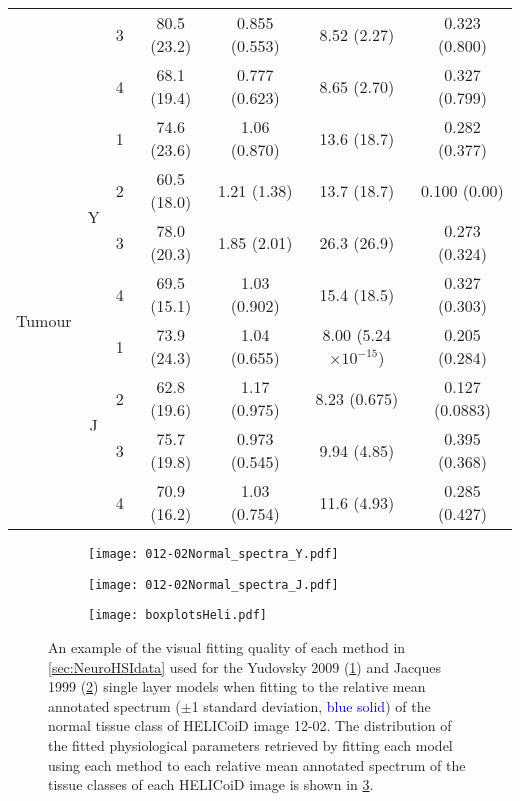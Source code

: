 \begin{table}[h!]
\begin{tabular}{|ccc|cccc|}
        & & 3 & 80.5 (23.2) & 0.855 (0.553) & 8.52 (2.27) & 0.323 (0.800) \\
        & & 4 & 68.1 (19.4) & 0.777 (0.623) & 8.65 (2.70) & 0.327 (0.799) \\
        \hline
        \multirow{8}{*}{Tumour} & \multirow{4}{*}{Y} & 1 & 74.6 (23.6) & 1.06 (0.870) & 13.6 (18.7) & 0.282 (0.377) \\
        & & 2 & 60.5 (18.0) & 1.21 (1.38) & 13.7 (18.7) & 0.100 (0.00) \\
        & & 3 & 78.0 (20.3) & 1.85 (2.01) & 26.3 (26.9) & 0.273 (0.324) \\
        & & 4 & 69.5 (15.1) & 1.03 (0.902) & 15.4 (18.5) & 0.327 (0.303) \\
        \cline{2-7}
        & \multirow{4}{*}{J} & 1 & 73.9 (24.3) & 1.04 (0.655) & 8.00 (5.24$\times 10^{-15}$) & 0.205 (0.284) \\
        & & 2 & 62.8 (19.6) & 1.17 (0.975) & 8.23 (0.675) & 0.127 (0.0883) \\
        & & 3 & 75.7 (19.8) & 0.973 (0.545) & 9.94 (4.85) & 0.395 (0.368) \\
        & & 4 & 70.9 (16.2) & 1.03 (0.754) & 11.6 (4.93) & 0.285 (0.427) \\
        \hline
    \end{tabular}    
    \label{tb:HELICoiD}
\end{table}

\begin{figure}[h!]
    \centering
    \begin{subfigure}{0.49\textwidth}
        \texttt{[image: 012-02Normal\_spectra\_Y.pdf]}
        \caption{}
        \label{fig:backwardsHSIHeliY}
    \end{subfigure}
    \begin{subfigure}{0.49\textwidth}
        \texttt{[image: 012-02Normal\_spectra\_J.pdf]}
        \caption{}
        \label{fig:backwardsHSIHeliJ}
    \end{subfigure}
    \begin{subfigure}{\textwidth}
        \texttt{[image: boxplotsHeli.pdf]}
        \caption{}
        \label{fig:boxplotsHeli}
    \end{subfigure}
    \caption{An example of the visual fitting quality of each method in \ref{sec:NeuroHSIdata} used for the Yudovsky 2009 (\ref{fig:backwardsHSIHeliY}) and Jacques 1999 (\ref{fig:backwardsHSIHeliJ}) single layer models when fitting to the relative mean annotated spectrum ($\pm$1 standard deviation, \textcolor{blue}{blue solid}) of the normal tissue class of HELICoiD image 12-02. The distribution of the fitted physiological parameters retrieved by fitting each model using each method to each relative mean annotated spectrum of the tissue classes of each HELICoiD image is shown in \ref{fig:boxplotsHeli}.}
    \label{fig:HELICoiDann}
\end{figure}

